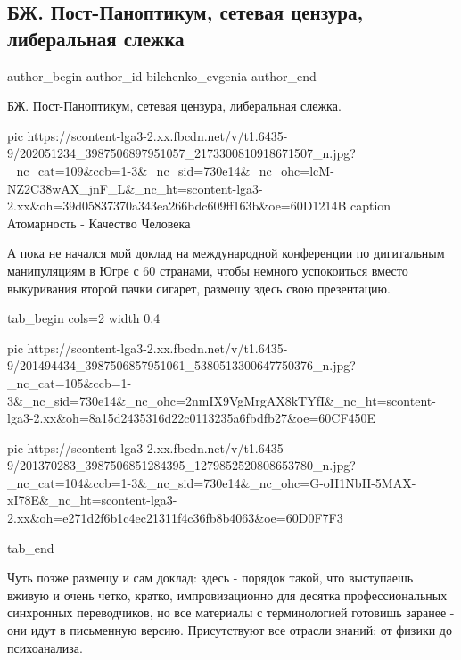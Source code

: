  
 
 
 
 
 
\subsection{БЖ. Пост-Паноптикум, сетевая цензура, либеральная слежка}
\label{sec:17_06_2021.fb.bilchenko_evgenia.4.post_panoptikum}
\ifcmt
 author_begin
   author_id bilchenko_evgenia
 author_end
\fi

БЖ. Пост-Паноптикум, сетевая цензура, либеральная слежка. 

\ifcmt
  pic https://scontent-lga3-2.xx.fbcdn.net/v/t1.6435-9/202051234_3987506897951057_2173300810918671507_n.jpg?_nc_cat=109&ccb=1-3&_nc_sid=730e14&_nc_ohc=lcM-NZ2C38wAX_jnF_L&_nc_ht=scontent-lga3-2.xx&oh=39d05837370a343ea266bdc609ff163b&oe=60D1214B
  caption Атомарность - Качество Человека
\fi

А пока не начался мой доклад на международной конференции по дигитальным
манипуляциям в Югре с 60 странами, чтобы немного успокоиться вместо выкуривания
второй пачки сигарет, размещу здесь свою презентацию. 


\ifcmt
  tab_begin cols=2
     width 0.4

     pic https://scontent-lga3-2.xx.fbcdn.net/v/t1.6435-9/201494434_3987506857951061_5380513300647750376_n.jpg?_nc_cat=105&ccb=1-3&_nc_sid=730e14&_nc_ohc=2nmIX9VgMrgAX8kTYfI&_nc_ht=scontent-lga3-2.xx&oh=8a15d2435316d22c0113235a6fbdfb27&oe=60CF450E

     pic https://scontent-lga3-2.xx.fbcdn.net/v/t1.6435-9/201370283_3987506851284395_1279852520808653780_n.jpg?_nc_cat=104&ccb=1-3&_nc_sid=730e14&_nc_ohc=G-oH1NbH-5MAX-xI78E&_nc_ht=scontent-lga3-2.xx&oh=e271d2f6b1c4ec21311f4c36fb8b4063&oe=60D0F7F3

  tab_end
\fi

Чуть позже размещу и сам доклад: здесь - порядок такой, что выступаешь вживую и
очень четко, кратко, импровизационно для десятка профессиональных синхронных
переводчиков, но все материалы с терминологией готовишь заранее - они идут в
письменную версию. Присутствуют все отрасли знаний: от физики до психоанализа.

